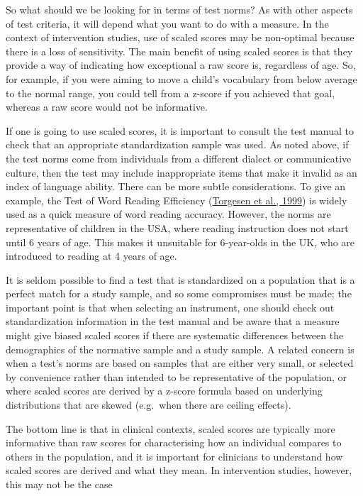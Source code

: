\documentclass{krantz}
\begin{document}
So what should we be looking for in terms of test norms? As with other aspects of test criteria, it will depend what you want to do with a measure. In the context of intervention studies, use of scaled scores may be non-optimal because there is a loss of sensitivity. The main benefit of using scaled scores is that they provide a way of indicating how exceptional a raw score is, regardless of age. So, for example, if you were aiming to move a child's vocabulary from below average to the normal range, you could tell from a z-score if you achieved that goal, whereas a raw score would not be informative.

If one is going to use scaled scores, it is important to consult the test manual to check that an appropriate standardization sample was used. As noted above, if the test norms come from individuals from a different dialect or communicative culture, then the test may include inappropriate items that make it invalid as an index of language ability. There can be more subtle considerations. To give an example, the Test of Word Reading Efficiency (\protect\hyperlink{ref-torgesen1999}{Torgesen et al., 1999}) is widely used as a quick measure of word reading accuracy. However, the norms are representative of children in the USA, where reading instruction does not start until 6 years of age. This makes it unsuitable for 6-year-olds in the UK, who are introduced to reading at 4 years of age.

It is seldom possible to find a test that is standardized on a population that is a perfect match for a study sample, and so some compromises must be made; the important point is that when selecting an instrument, one should check out standardization information in the test manual and be aware that a measure might give biased scaled scores if there are systematic differences between the demographics of the normative sample and a study sample. A related concern is when a test's norms are based on samples that are either very small, or selected by convenience rather than intended to be representative of the population, or where scaled scores are derived by a z-score formula based on underlying distributions that are skewed (e.g.~when there are ceiling effects).

The bottom line is that in clinical contexts, scaled scores are typically more informative than raw scores for characterising how an individual compares to others in the population, and it is important for clinicians to understand how scaled scores are derived and what they mean. In intervention studies, however, this may not be the case
\end{document}
